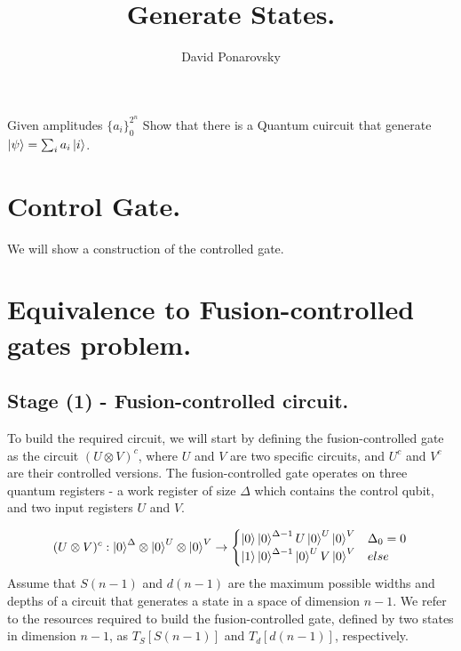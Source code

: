 \documentclass[manuscript,screen,review]{acmart}
\begin{document}


\title{Generate States.} 
\author{David Ponarovsky}

\ifdefined\ACM
\else
  \maketitle
\fi
%
\ifdefined\ACM
  \maketitle
\fi

% 



\begin{problem} Given amplitudes $\{ a_{i} \}_{0}^{2^{n}}$ Show that there is a Quantum cuircuit that generate $\ket{\psi} = \sum_{i}{a_{i}\ket{i}}$.
\end{problem}

\section{Control Gate.}


We will show a construction of the controlled gate. 

\section{Equivalence to Fusion-controlled gates problem.}
\subsection{Stage (1) - Fusion-controlled circuit.}

To build the required circuit, we will start by defining the fusion-controlled gate as the circuit $(U\otimes V)^{c}$, where $U$ and $V$ are two specific circuits, and $U^{c}$ and $V^{c}$ are their controlled versions. The fusion-controlled gate operates on three quantum registers - a work register of size $\Delta$ which contains the control qubit, and two input registers $U$ and $V$.

\begin{equation*}
  (U\otimes V)^{c} :\ket{0}^{\Delta}\otimes \ket{0}^{U}\otimes \ket{0}^{V}   \rightarrow 
  \begin{cases}
  \ket{0} \ket{0}^{\Delta -1} U\ket{0}^{U} \ket{0}^{V} & \Delta_{0} = 0\\
  \ket{1} \ket{0}^{\Delta -1} \ket{0}^{U} V\ket{0}^{V} & else
\end{cases} 
\end{equation*}
Assume that $S(n-1)$ and $d(n-1)$ are the maximum possible widths and depths of a circuit that generates a state in a space of dimension $n-1$. We refer to the resources required to build the fusion-controlled gate, defined by two states in dimension $n-1$, as $T_{S}[S(n-1)]$ and $T_{d}[d(n-1)]$, respectively.
\end{document}
